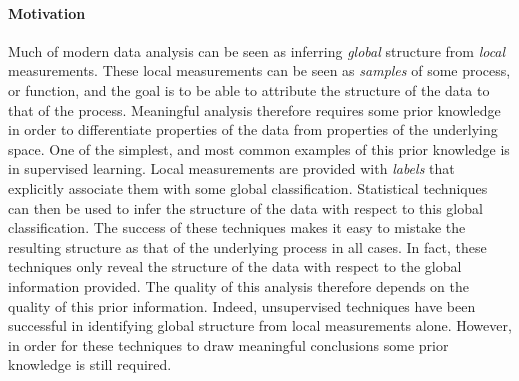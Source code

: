 \paragraph{Motivation}

Much of modern data analysis can be seen as inferring \emph{global} structure from \emph{local} measurements.
These local measurements can be seen as \emph{samples} of some process, or function, and the goal is to be able to attribute the structure of the data to that of the process.
Meaningful analysis therefore requires some prior knowledge in order to differentiate properties of the data from properties of the underlying space.
One of the simplest, and most common examples of this prior knowledge is in supervised learning.
Local measurements are provided with \emph{labels} that explicitly associate them with some global classification.
Statistical techniques can then be used to infer the structure of the data with respect to this global classification.
The success of these techniques makes it easy to mistake the resulting structure as that of the underlying process in all cases.
In fact, these techniques only reveal the structure of the data with respect to the global information provided.
The quality of this analysis therefore depends on the quality of this prior information.
Indeed, unsupervised techniques have been successful in identifying global structure from local measurements alone.
However, in order for these techniques to draw meaningful conclusions some prior knowledge is still required.

